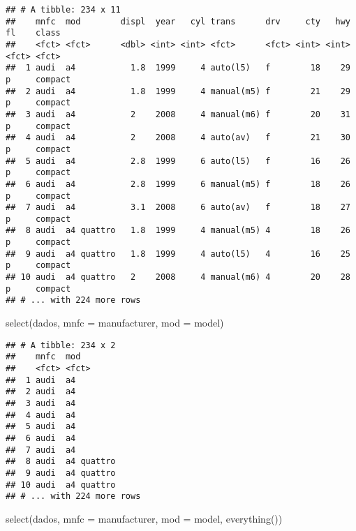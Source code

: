 \documentclass[
]{book}
\newenvironment{Shaded}{\begin{snugshade}}{\end{snugshade}}
\newcommand{\AttributeTok}[1]{\textcolor[rgb]{0.77,0.63,0.00}{#1}}
\newcommand{\FunctionTok}[1]{\textcolor[rgb]{0.00,0.00,0.00}{#1}}
\newcommand{\NormalTok}[1]{#1}
\begin{document}
\begin{verbatim}
## # A tibble: 234 x 11
##    mnfc  mod        displ  year   cyl trans      drv     cty   hwy fl    class  
##    <fct> <fct>      <dbl> <int> <int> <fct>      <fct> <int> <int> <fct> <fct>  
##  1 audi  a4           1.8  1999     4 auto(l5)   f        18    29 p     compact
##  2 audi  a4           1.8  1999     4 manual(m5) f        21    29 p     compact
##  3 audi  a4           2    2008     4 manual(m6) f        20    31 p     compact
##  4 audi  a4           2    2008     4 auto(av)   f        21    30 p     compact
##  5 audi  a4           2.8  1999     6 auto(l5)   f        16    26 p     compact
##  6 audi  a4           2.8  1999     6 manual(m5) f        18    26 p     compact
##  7 audi  a4           3.1  2008     6 auto(av)   f        18    27 p     compact
##  8 audi  a4 quattro   1.8  1999     4 manual(m5) 4        18    26 p     compact
##  9 audi  a4 quattro   1.8  1999     4 auto(l5)   4        16    25 p     compact
## 10 audi  a4 quattro   2    2008     4 manual(m6) 4        20    28 p     compact
## # ... with 224 more rows
\end{verbatim}

\begin{Shaded}
\begin{Highlighting}[]
\FunctionTok{select}\NormalTok{(dados,}
       \AttributeTok{mnfc =}\NormalTok{ manufacturer,}
       \AttributeTok{mod =}\NormalTok{ model)}
\end{Highlighting}
\end{Shaded}

\begin{verbatim}
## # A tibble: 234 x 2
##    mnfc  mod       
##    <fct> <fct>     
##  1 audi  a4        
##  2 audi  a4        
##  3 audi  a4        
##  4 audi  a4        
##  5 audi  a4        
##  6 audi  a4        
##  7 audi  a4        
##  8 audi  a4 quattro
##  9 audi  a4 quattro
## 10 audi  a4 quattro
## # ... with 224 more rows
\end{verbatim}

\begin{Shaded}
\begin{Highlighting}[]
\FunctionTok{select}\NormalTok{(dados,}
       \AttributeTok{mnfc =}\NormalTok{ manufacturer,}
       \AttributeTok{mod =}\NormalTok{ model,}
       \FunctionTok{everything}\NormalTok{())}
\end{Highlighting}
\end{Shaded}
\end{document}
